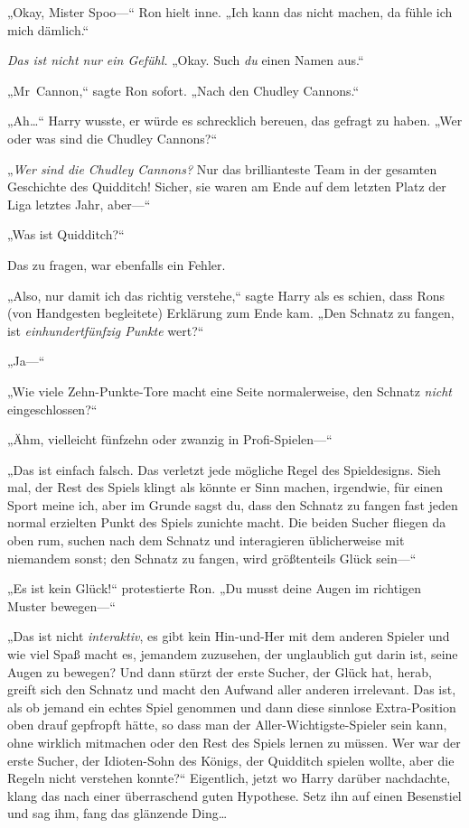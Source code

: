 {„Okay, Mister Spoo—“ Ron hielt inne. „Ich kann das nicht machen, da fühle ich mich dämlich.“

\emph{Das ist nicht nur ein Gefühl.} „Okay. Such \emph{du} einen Namen aus.“

„Mr~Cannon,“ sagte Ron sofort. „Nach den Chudley Cannons.“

„Ah…“ Harry wusste, er würde es schrecklich bereuen, das gefragt zu haben. „Wer oder was sind die Chudley Cannons?“

„\emph{Wer sind die Chudley Cannons?} Nur das brillianteste Team in der gesamten Geschichte des Quidditch! Sicher, sie waren am Ende auf dem letzten Platz der Liga letztes Jahr, aber—“

„Was ist Quidditch?“

Das zu fragen, war ebenfalls ein Fehler.

„Also, nur damit ich das richtig verstehe,“ sagte Harry als es schien, dass Rons (von Handgesten begleitete) Erklärung zum Ende kam. „Den Schnatz zu fangen, ist \emph{einhundertfünfzig Punkte} wert?“

„Ja—“

„Wie viele Zehn-Punkte-Tore macht eine Seite normalerweise, den Schnatz \emph{nicht} eingeschlossen?“

„Ähm, vielleicht fünfzehn oder zwanzig in Profi-Spielen—“

„Das ist einfach falsch. Das verletzt jede mögliche Regel des Spieldesigns. Sieh mal, der Rest des Spiels klingt als könnte er Sinn machen, irgendwie, für einen Sport meine ich, aber im Grunde sagst du, dass den Schnatz zu fangen fast jeden normal erzielten Punkt des Spiels zunichte macht. Die beiden Sucher fliegen da oben rum, suchen nach dem Schnatz und interagieren üblicherweise mit niemandem sonst; den Schnatz zu fangen, wird größtenteils Glück sein—“

„Es ist kein Glück!“ protestierte Ron. „Du musst deine Augen im richtigen Muster bewegen—“

„Das ist nicht \emph{interaktiv}, es gibt kein Hin-und-Her mit dem anderen Spieler und wie viel Spaß macht es, jemandem zuzusehen, der unglaublich gut darin ist, seine Augen zu bewegen? Und dann stürzt der erste Sucher, der Glück hat, herab, greift sich den Schnatz und macht den Aufwand aller anderen irrelevant. Das ist, als ob jemand ein echtes Spiel genommen und dann diese sinnlose Extra-Position oben drauf gepfropft hätte, so dass man der Aller-Wichtigste-Spieler sein kann, ohne wirklich mitmachen oder den Rest des Spiels lernen zu müssen. Wer war der erste Sucher, der Idioten-Sohn des Königs, der Quidditch spielen wollte, aber die Regeln nicht verstehen konnte?“ Eigentlich, jetzt wo Harry darüber nachdachte, klang das nach einer überraschend guten Hypothese. Setz ihn auf einen Besenstiel und sag ihm, fang das glänzende Ding…

}
